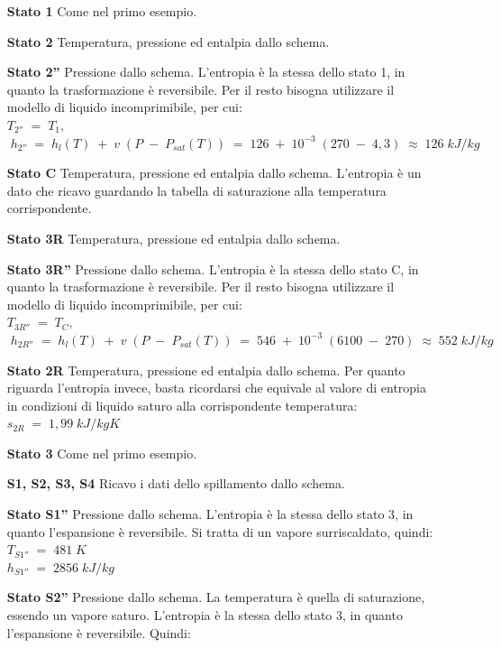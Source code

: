 \documentclass[a4paper, twoside, 12pt]{report}
\begin{document}
\begin{itemize}
	\item[\textbf{Stato 1  }] Come nel primo esempio.
	\item[\textbf{Stato 2  }] Temperatura, pressione ed entalpia dallo schema.
	\item[\textbf{Stato 2''}] Pressione dallo schema. L'entropia è la stessa dello stato 1, in quanto la trasformazione è reversibile. Per il resto bisogna utilizzare il modello di liquido incomprimibile, per cui:\\
	$T_{2''}\;=\;T_{1},$\\
	$\;h_{2''}\;=\;h_{l}(T)\;+\;v\;(P\;-\;P_{sat}(T))\;=\;126\;+\;10^{-3}\;(270\;-\;4,3)\;\approx\;126\;kJ/kg$
	\item[\textbf{Stato C  }] Temperatura, pressione ed entalpia dallo schema. L'entropia è un dato che ricavo guardando la tabella di saturazione alla temperatura corrispondente.
	\item[\textbf{Stato 3R}] Temperatura, pressione ed entalpia dallo schema.
	\item[\textbf{Stato 3R''}] Pressione dallo schema. L'entropia è la stessa dello stato C, in quanto la trasformazione è reversibile. Per il resto bisogna utilizzare il modello di liquido incomprimibile, per cui:\\
	$T_{3R''}\;=\;T_{C},$\\
	$\;h_{2R''}\;=\;h_{l}(T)\;+\;v\;(P\;-\;P_{sat}(T))\;=\;546\;+\;10^{-3}\;(6100\;-\;270)\;\approx\;552\;kJ/kg$
	\item[\textbf{Stato 2R}] Temperatura, pressione ed entalpia dallo schema. Per quanto riguarda l'entropia invece, basta ricordarsi che equivale al valore di entropia in condizioni di liquido saturo alla corrispondente temperatura:\\
	$s_{2R}\;=\;1,99\;kJ/kgK$
	\item[\textbf{Stato 3  }] Come nel primo esempio.
	\item[\textbf{S1, S2, S3, S4  }] Ricavo i dati dello spillamento dallo schema.
	\item[\textbf{Stato S1''}] Pressione dallo schema. L'entropia è la stessa dello stato 3, in quanto l'espansione è reversibile. Si tratta di un vapore surriscaldato, quindi:\\
	$T_{S1''}\;=\;481\;K$\\
	$h_{S1''}\;=\;2856\;kJ/kg$
	\item[\textbf{Stato S2''}] Pressione dallo schema. La temperatura è quella di saturazione, essendo un vapore saturo. L'entropia è la stessa dello stato 3, in quanto l'espansione è reversibile. Quindi:\\

\end{itemize}
\end{document}
